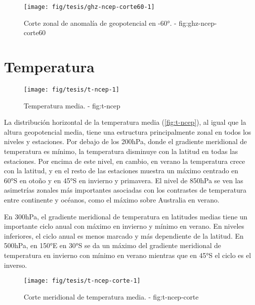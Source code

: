 \documentclass[spanish,a4paper,12p]{book}
\begin{document}
\begin{figure}

{\centering \texttt{[image: fig/tesis/ghz-ncep-corte60-1]} 

}

\caption{Corte zonal de anomalía de geopotencial en -60°. - fig:ghz-ncep-corte60}\label{fig:ghz-ncep-corte60}
\end{figure}

\section{Temperatura}\label{temperatura}

\begin{landscape}\begin{figure}

{\centering \texttt{[image: fig/tesis/t-ncep-1]} 

}

\caption{Temperatura media. - fig:t-ncep}\label{fig:t-ncep}
\end{figure}
\end{landscape}

La distribución horizontal de la temperatura media
(\autoref{fig:t-ncep}), al igual que la altura geopotencial media, tiene
una estructura principalmente zonal en todos los niveles y estaciones.
Por debajo de los 200hPa, donde el gradiente meridional de temperatura
es mínimo, la temperatura disminuye con la latitud en todas las
estaciones. Por encima de este nivel, en cambio, en verano la
temperatura crece con la latitud, y en el resto de las estaciones
muestra un máximo centrado en 60°S en otoño y en 45°S en invierno y
primavera. El nivel de 850hPa se ven las asimetrías zonales más
importantes asociadas con los contrastes de temperatura entre continente
y océanos, como el máximo sobre Australia en verano.

En 300hPa, el gradiente meridional de temperatura en latitudes medias
tiene un importante ciclo anual con máximo en invierno y mínimo en
verano. En niveles inferiores, el ciclo anual es menos marcado y más
dependiente de la latitud. En 500hPa, en 150°E en 30°S se da un máximo
del gradiente meridional de temperatura en invierno con mínimo en verano
mientras que en 45°S el ciclo es el inverso.

\begin{figure}

{\centering \texttt{[image: fig/tesis/t-ncep-corte-1]} 

}

\caption{Corte meridional de temperatura media. - fig:t-ncep-corte}\label{fig:t-ncep-corte}
\end{figure}
\end{document}
